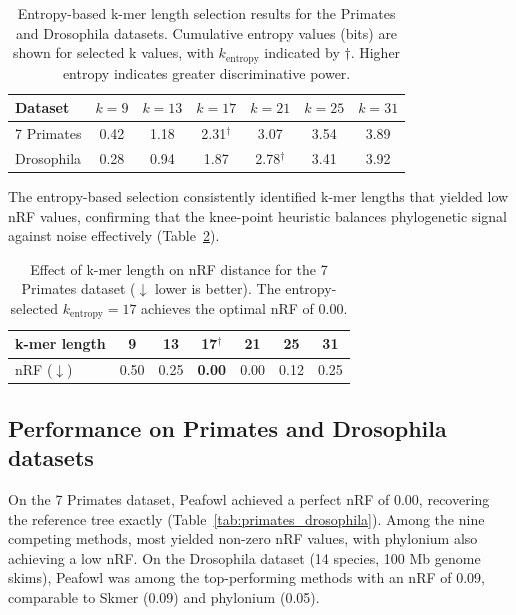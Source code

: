 \documentclass[11pt]{article}
\begin{document}
\begin{table}[H]
\centering
\caption{Entropy-based k-mer length selection results for the Primates and Drosophila datasets. Cumulative entropy values (bits) are shown for selected k values, with $k_{\text{entropy}}$ indicated by $\dagger$. Higher entropy indicates greater discriminative power.}
\label{tab:entropy}
\begin{tabular}{lcccccc}
\toprule
\textbf{Dataset} & $k=9$ & $k=13$ & $k=17$ & $k=21$ & $k=25$ & $k=31$ \\
\midrule
7 Primates & 0.42 & 1.18 & 2.31$^\dagger$ & 3.07 & 3.54 & 3.89 \\
Drosophila & 0.28 & 0.94 & 1.87 & 2.78$^\dagger$ & 3.41 & 3.92 \\
\bottomrule
\end{tabular}
\end{table}

The entropy-based selection consistently identified k-mer lengths that yielded low nRF values, confirming that the knee-point heuristic balances phylogenetic signal against noise effectively (Table~\ref{tab:kmer_nrf}).

\begin{table}[H]
\centering
\caption{Effect of k-mer length on nRF distance for the 7 Primates dataset ($\downarrow$ lower is better). The entropy-selected $k_{\text{entropy}} = 17$ achieves the optimal nRF of 0.00.}
\label{tab:kmer_nrf}
\begin{tabular}{lcccccc}
\toprule
\textbf{k-mer length} & 9 & 13 & 17$^\dagger$ & 21 & 25 & 31 \\
\midrule
nRF ($\downarrow$) & 0.50 & 0.25 & \textbf{0.00} & 0.00 & 0.12 & 0.25 \\
\bottomrule
\end{tabular}
\end{table}

\subsection{Performance on Primates and Drosophila datasets}

On the 7 Primates dataset, Peafowl achieved a perfect nRF of 0.00, recovering the reference tree exactly (Table~\ref{tab:primates_drosophila}). Among the nine competing methods, most yielded non-zero nRF values, with phylonium also achieving a low nRF. On the Drosophila dataset (14 species, 100 Mb genome skims), Peafowl was among the top-performing methods with an nRF of 0.09, comparable to Skmer (0.09) and phylonium (0.05).
\end{document}
